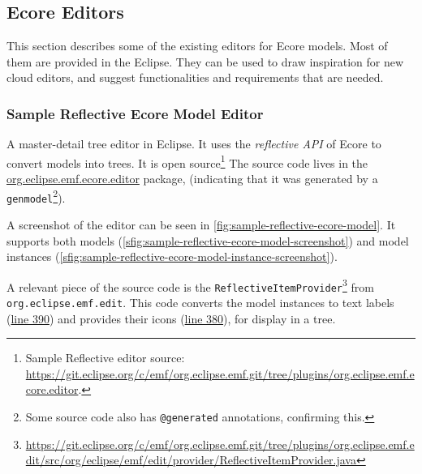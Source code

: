\subsection{Ecore Editors}

This section describes some of the existing editors for \gls{Ecore} models.
Most of them are provided in the \gls{Eclipse}.
They can be used to draw inspiration for new \gls{cloud} editors, and suggest functionalities and requirements that are needed.

\subsubsection{Sample Reflective Ecore Model Editor} %
A master-detail tree editor in \gls{Eclipse}.
It uses the \emph{reflective \acrshort{API}} of \gls{Ecore} to convert models into trees.
It is \gls{open source}\footnote{Sample Reflective editor source: \href{https://git.eclipse.org/c/emf/org.eclipse.emf.git/tree/plugins/org.eclipse.emf.ecore.editor}{https://git.eclipse.org/c/emf/org.eclipse.emf.git/tree/plugins/org.eclipse.emf.ecore.editor}.}
The source code lives in the \href{https://git.eclipse.org/c/emf/org.eclipse.emf.git/tree/plugins/org.eclipse.emf.ecore.editor/src/org/eclipse/emf/ecore/presentation/EcoreEditor.java}{org.eclipse.emf.ecore.editor} package, (indicating that it was generated by a \texttt{genmodel}\footnote{Some source code also has \texttt{@generated} annotations, confirming this.}).

A screenshot of the editor can be seen in \cref{fig:sample-reflective-ecore-model}.
It supports both models (\cref{sfig:sample-reflective-ecore-model-screenshot}) and model instances (\cref{sfig:sample-reflective-ecore-model-instance-screenshot}).

A relevant piece of the source code is the \texttt{ReflectiveItemProvider}\footnote{\href{https://git.eclipse.org/c/emf/org.eclipse.emf.git/tree/plugins/org.eclipse.emf.edit/src/org/eclipse/emf/edit/provider/ReflectiveItemProvider.java}{https://git.eclipse.org/c/emf/org.eclipse.emf.git/tree/plugins/org.eclipse.emf.edit/src/org/eclipse/emf/edit/provider/ReflectiveItemProvider.java}} from \texttt{org.eclipse.emf.edit}.
This code converts the model instances to text labels (\href{https://git.eclipse.org/c/emf/org.eclipse.emf.git/tree/plugins/org.eclipse.emf.edit/src/org/eclipse/emf/edit/provider/ReflectiveItemProvider.java#n390}{line 390}) and provides their icons (\href{https://git.eclipse.org/c/emf/org.eclipse.emf.git/tree/plugins/org.eclipse.emf.edit/src/org/eclipse/emf/edit/provider/ReflectiveItemProvider.java#n380}{line 380}), for display in a tree.

